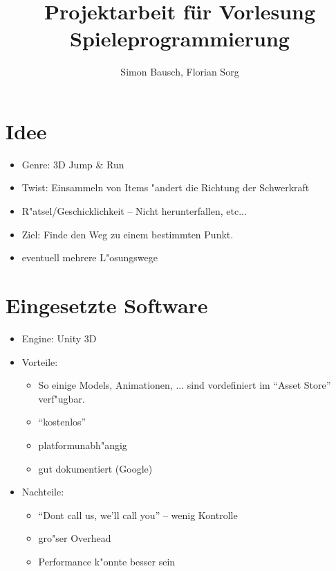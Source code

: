\documentclass[landscape,compress,table]{beamer}
\title{Projektarbeit f\"ur Vorlesung Spieleprogrammierung}
\author{Simon Bausch, Florian Sorg}
\institute{Hochschule Aalen}
\begin{document}
\begin{frame}
	\titlepage
\end{frame}

\begin{frame}
	\tableofcontents
\end{frame}

\section{Idee}
\begin{frame}
	\begin{itemize}
		\item
			Genre: 3D Jump \& Run
		\item
			Twist: Einsammeln von Items "andert die
			Richtung der Schwerkraft
		\item
			R"atsel/Geschicklichkeit -- Nicht herunterfallen, etc...
		\item
			Ziel: Finde den Weg zu einem bestimmten Punkt.
		\item
			eventuell mehrere L"osungswege
	\end{itemize}
\end{frame}

\section{Eingesetzte Software}
\begin{frame}
	\begin{itemize}
		\item Engine: Unity 3D
		\item Vorteile:
			\begin{itemize}
				\item
					So einige Models, Animationen, ...
					sind vordefiniert im ``Asset Store''
					verf"ugbar.
				\item ``kostenlos''
				\item platformunabh"angig
				\item gut dokumentiert (Google)
			\end{itemize}
		\item Nachteile:
			\begin{itemize}
				\item ``Dont call us, we'll call you'' -- wenig Kontrolle
				\item gro"ser Overhead
				\item Performance k"onnte besser sein
			\end{itemize}
	\end{itemize}
\end{frame}
\end{document}
